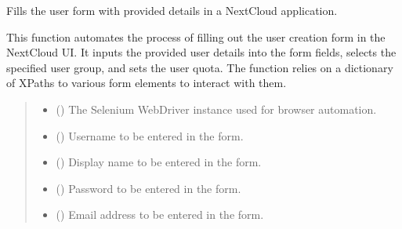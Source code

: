 \documentclass[letterpaper,10pt,english]{sphinxmanual}
\begin{document}
\begin{fulllineitems}
\label{\detokenize{utils:utils.user_management.fill_user_form}}
\pysigstartsignatures
{}
\pysigstopsignatures
\sphinxAtStartPar
Fills the user form with provided details in a NextCloud application.

\sphinxAtStartPar
This function automates the process of filling out the user creation form in the NextCloud UI. 
It inputs the provided user details into the form fields, selects the specified user group, and sets the user quota. 
The function relies on a dictionary of XPaths to various form elements to interact with them.
\begin{quote}\begin{description}
\begin{itemize}
\item {} 
\sphinxAtStartPar
{} () \textendash{} The Selenium WebDriver instance used for browser automation.

\item {} 
\sphinxAtStartPar
{} () \textendash{} Username to be entered in the form.

\item {} 
\sphinxAtStartPar
{} () \textendash{} Display name to be entered in the form.

\item {} 
\sphinxAtStartPar
{} () \textendash{} Password to be entered in the form.

\item {} 
\sphinxAtStartPar
{} () \textendash{} Email address to be entered in the form.


\end{itemize}
\end{description}
\end{quote}
\end{fulllineitems}
\end{document}
